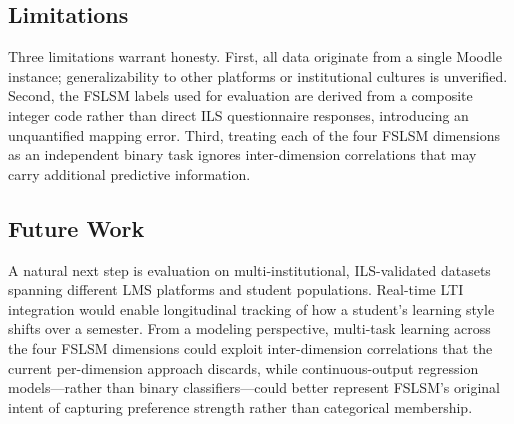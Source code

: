 \documentclass[journal, onecolumn]{IEEEtran}
\begin{document}
\subsection{Limitations}

Three limitations warrant honesty. First, all data originate from a single Moodle instance; generalizability to other platforms or institutional cultures is unverified. Second, the FSLSM labels used for evaluation are derived from a composite integer code rather than direct ILS questionnaire responses, introducing an unquantified mapping error. Third, treating each of the four FSLSM dimensions as an independent binary task ignores inter-dimension correlations that may carry additional predictive information.

\subsection{Future Work}

A natural next step is evaluation on multi-institutional, ILS-validated datasets spanning different LMS platforms and student populations. Real-time LTI integration would enable longitudinal tracking of how a student's learning style shifts over a semester. From a modeling perspective, multi-task learning across the four FSLSM dimensions could exploit inter-dimension correlations that the current per-dimension approach discards, while continuous-output regression models---rather than binary classifiers---could better represent FSLSM's original intent of capturing preference strength rather than categorical membership.
\end{document}
